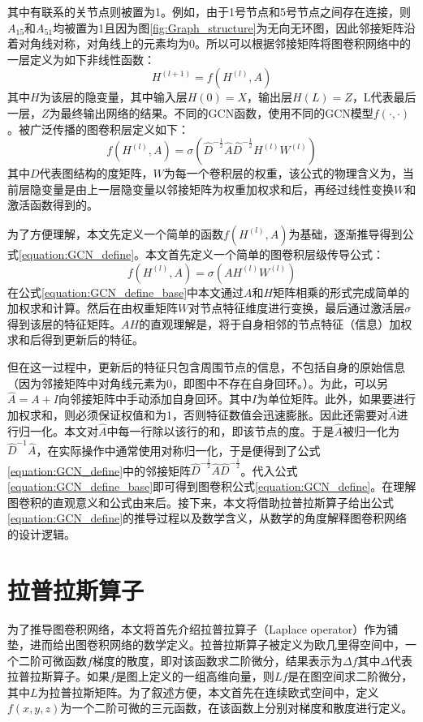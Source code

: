 其中有联系的关节点则被置为1。例如，由于1号节点和5号节点之间存在连接，则$A_{15}$和$A_{51}$均被置为1且因为图\ref{fig:Graph_structure}为无向无环图，因此邻接矩阵沿着对角线对称，对角线上的元素均为0。所以可以根据邻接矩阵将图卷积网络中的一层定义为如下非线性函数：
\begin{equation}
   H^{(l+1)} = f(H^{(l)} ,A)
    \label{equation:GCN_simple_define}
\end{equation}
其中$H$为该层的隐变量，其中输入层$H(0)=X$，输出层$H(L)=Z$，L代表最后一层，$Z$为最终输出网络的结果。不同的GCN函数，使用不同的GCN模型$f(\cdot,\cdot)$。被广泛传播的图卷积层定义如下：
\begin{equation}
    f(H^{(l)},A) = \sigma\left( \hat{D}^{-\frac{1}{2}} \hat{A} \hat{D}^{-\frac{1}{2}} H^{(l)}W^{(l)} \right)
    \label{equation:GCN_define}
 \end{equation}
其中$D$代表图结构的度矩阵，$W$为每一个卷积层的权重，该公式的物理含义为，当前层隐变量是由上一层隐变量以邻接矩阵为权重加权求和后，再经过线性变换$W$和激活函数得到的。

为了方便理解，本文先定义一个简单的函数$f(H^{(l)},A)$为基础，逐渐推导得到公式\ref{equation:GCN_define}。本文首先定义一个简单的图卷积层级传导公式：
\begin{equation}
    f(H^{(l)},A) = \sigma\left( {A}H^{(l)}W^{(l)} \right)
    \label{equation:GCN_define_base}
 \end{equation}
 在公式\ref{equation:GCN_define_base}中本文通过$A$和$H$矩阵相乘的形式完成简单的加权求和计算。然后在由权重矩阵$W$对节点特征维度进行变换，最后通过激活层$\sigma$得到该层的特征矩阵。$AH$的直观理解是，将于自身相邻的节点特征（信息）加权求和后得到更新后的特征。

 但在这一过程中，更新后的特征只包含周围节点的信息，不包括自身的原始信息（因为邻接矩阵中对角线元素为0，即图中不存在自身回环。）。为此，可以另$\hat{A} = A + I$向邻接矩阵中手动添加自身回环。其中$I$为单位矩阵。此外，如果要进行加权求和，则必须保证权值和为1，否则特征数值会迅速膨胀。因此还需要对$\hat{A}$进行归一化。本文对$\hat{A}$中每一行除以该行的和，即该节点的度。于是$\hat{A}$被归一化为$\hat{D}^{-1}\hat{A}$，在实际操作中通常使用对称归一化，于是便得到了公式\ref{equation:GCN_define}中的邻接矩阵$\hat{D}^{-\frac{1}{2}}\hat{A}\hat{D}^{-\frac{1}{2}}$。代入公式\ref{equation:GCN_define_base}即可得到图卷积公式\ref{equation:GCN_define}。在理解图卷积的直观意义和公式由来后。接下来，本文将借助拉普拉斯算子给出公式\ref{equation:GCN_define}的推导过程以及数学含义，从数学的角度解释图卷积网络的设计逻辑。
\section{拉普拉斯算子}
为了推导图卷积网络，本文将首先介绍拉普拉算子（Laplace operator）作为铺垫，进而给出图卷积网络的数学定义。拉普拉斯算子被定义为欧几里得空间中，一个二阶可微函数$f$梯度的散度，即对该函数求二阶微分，结果表示为$\Delta f$其中$\Delta$代表拉普拉斯算子。如果$f$是图上定义的一组高维向量，则$Lf$是在图空间求二阶微分，其中$L$为拉普拉斯矩阵。为了叙述方便，本文首先在连续欧式空间中，定义$f(x,y,z)$为一个二阶可微的三元函数，在该函数上分别对梯度和散度进行定义。

